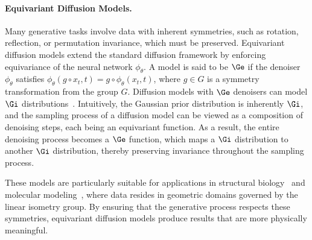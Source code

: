 \paragraph{Equivariant Diffusion Models.}
Many generative tasks involve data with inherent symmetries, such as rotation, reflection, or permutation invariance, which must be preserved. Equivariant diffusion models extend the standard diffusion framework by enforcing equivariance of the neural network \( \phi_\theta \). A model is said to be \(\Ge\) if the denoiser \(\phi_\theta\) satisfies \(\phi_\theta(g \circ x_t, t) = g \circ \phi_\theta(x_t, t)\), where \(g \in G\) is a symmetry transformation from the group \(G\). Diffusion models with \(\Ge\) denoisers can model \(\Gi\) distributions~. Intuitively, the Gaussian prior distribution is inherently \(\Gi\), and the sampling process of a diffusion model can be viewed as a composition of denoising steps, each being an equivariant function. As a result, the entire denoising process becomes a \(\Ge\) function, which maps a \(\Gi\) distribution to another \(\Gi\) distribution, thereby preserving invariance throughout the sampling process.



These models are particularly suitable for applications in structural biology~ and molecular modeling~, where data resides in geometric domains governed by the linear isometry group. By ensuring that the generative process respects these symmetries, equivariant diffusion models produce results that are more physically meaningful.



